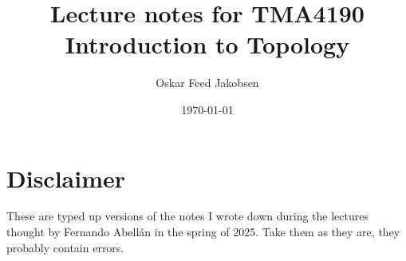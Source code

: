 \documentclass{article}
\title{Lecture notes for TMA4190 Introduction to Topology}
\date{\today}
\author{Oskar Feed Jakobsen}
\begin{document}
\maketitle
\newpage
\tableofcontents
\newpage
\section*{Disclaimer}

These are typed up versions of the notes I wrote down during the
lectures thought by Fernando Abellán
in the spring of 2025.
Take them as they are, they probably contain errors.

\newpage



























\end{document}
